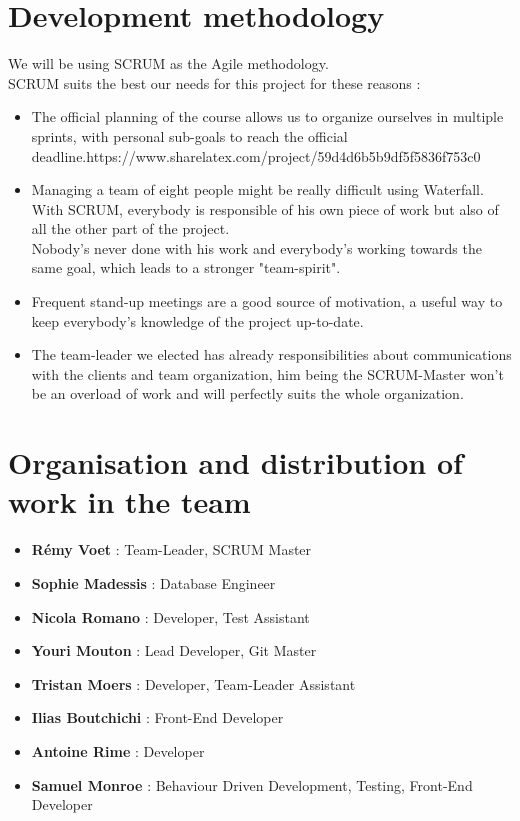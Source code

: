 \documentclass{article}
\begin{document}
\section{Development methodology}
    
    We will be using SCRUM as the Agile methodology.\\
    
    SCRUM suits the best our needs for this project for these reasons : \\
        
        \begin{itemize}
            \item The official planning of the course allows us to organize ourselves 
            in multiple sprints, with personal sub-goals to reach the 
            official deadline.https://www.sharelatex.com/project/59d4d6b5b9df5f5836f753c0
            \item Managing a team of eight people might be really difficult using 
            Waterfall. With SCRUM, everybody is responsible of his own piece of 
            work but also of all the other part of the project.\\
            Nobody's never done with his work and everybody's working towards the 
            same goal, which leads to a stronger "team-spirit".
            \item Frequent stand-up meetings are a good source of motivation, a 
            useful way to keep everybody's knowledge of the project up-to-date.
            \item The team-leader we elected has already responsibilities about
            communications with the clients and team organization, him being the
            SCRUM-Master won't be an overload of work and will perfectly suits the
            whole organization.
            
    \end{itemize}

\section{Organisation and distribution of work in the team}
    
    \begin{itemize}
    
        \item \textbf{Rémy Voet} : Team-Leader, SCRUM Master
        \item \textbf{Sophie Madessis} : Database Engineer
        \item \textbf{Nicola Romano} : Developer, Test Assistant 
        \item \textbf{Youri Mouton} : Lead Developer, Git Master
        \item \textbf{Tristan Moers} : Developer, Team-Leader Assistant
        \item \textbf{Ilias Boutchichi} : Front-End Developer
        \item \textbf{Antoine Rime} : Developer
        \item \textbf{Samuel Monroe} : Behaviour Driven Development, Testing, Front-End Developer
    \end{itemize}
\end{document}
